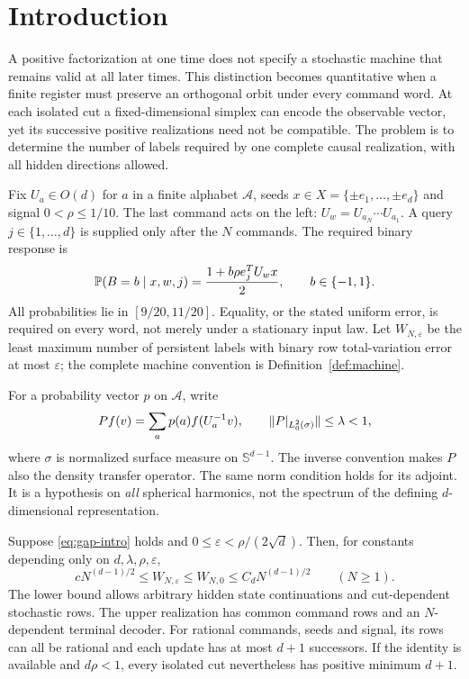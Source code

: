 \section{Introduction}
A positive factorization at one time does not specify a stochastic machine
that remains valid at all later times. This distinction becomes quantitative
when a finite register must preserve an orthogonal orbit under every
command word. At each isolated cut a fixed-dimensional simplex can encode
the observable vector, yet its successive positive realizations need not
be compatible. The problem is to determine the number of labels required
by one complete causal realization, with all hidden directions allowed.

Fix $U_a\in O(d)$ for $a$ in a finite alphabet $\mathcal A$,
seeds $x\in X=\{\pm e_1,\ldots,\pm e_d\}$ and signal
$0<\rho\le1/10$. The last command acts on the left:
$U_w=U_{a_N}\cdots U_{a_1}$. A query $j\in\{1,\ldots,d\}$ is supplied
only after the $N$ commands. The required binary response is
\begin{equation}\label{eq:law}
 \mathbb P(B=b\mid x,w,j)=\frac{1+b\rho e_j^TU_wx}{2},\qquad b\in\{-1,1\}.
\end{equation}
All probabilities lie in $[9/20,11/20]$. Equality, or the stated uniform
error, is required on every word, not merely under a stationary input law.
Let $W_{N,\varepsilon}$ be the least maximum number of persistent labels
with binary row total-variation error at most $\varepsilon$; the complete
machine convention is Definition~\ref{def:machine}.

For a probability vector $p$ on $\mathcal A$, write
\begin{equation}\label{eq:gap-intro}
 Pf(v)=\sum_a p(a)f(U_a^{-1}v),\qquad
 \lVert P|_{L^2_0(\sigma)}\rVert\le\lambda<1,
\end{equation}
where $\sigma$ is normalized surface measure on $\mathbb S^{d-1}$.
The inverse convention makes $P$ also the density transfer operator.
The same norm condition holds for its adjoint. It is a hypothesis on
\emph{all} spherical harmonics, not the spectrum of the defining
$d$-dimensional representation.

\begin{theorem}\label{thm:main}
Suppose \eqref{eq:gap-intro} holds and
$0\le\varepsilon<\rho/(2\sqrt d)$. Then, for constants depending only
on $d,\lambda,\rho,\varepsilon$,
\begin{equation}\label{eq:sharp}
 cN^{(d-1)/2}\le W_{N,\varepsilon}
       \le W_{N,0}\le C_dN^{(d-1)/2}\qquad(N\ge1).
\end{equation}
The lower bound allows arbitrary hidden state continuations and
cut-dependent stochastic rows. The upper realization has common command
rows and an $N$-dependent terminal decoder. For rational commands,
seeds and signal, its rows can all be rational and each update has at
most $d+1$ successors. If the identity is available and $d\rho<1$,
every isolated cut nevertheless has positive minimum $d+1$.
\end{theorem}

